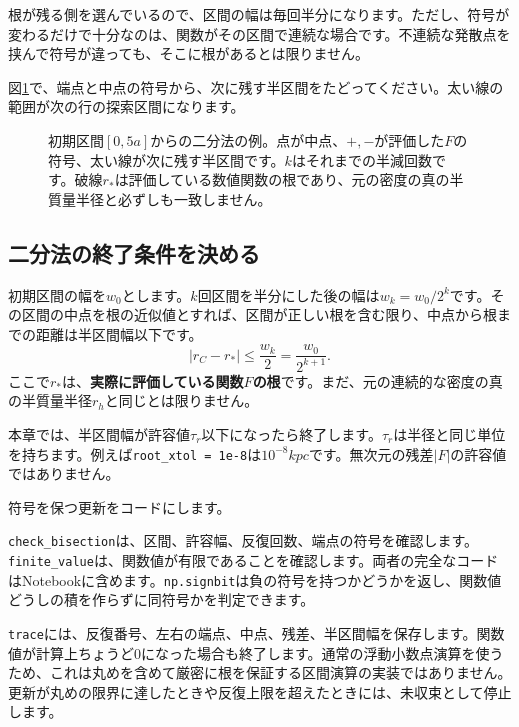 根が残る側を選んでいるので、区間の幅は毎回半分になります。ただし、符号が変わるだけで十分なのは、関数がその区間で連続な場合です。不連続な発散点を挟んで符号が違っても、そこに根があるとは限りません。


図\ref{fig:concept-ch3-bisection}で、端点と中点の符号から、次に残す半区間をたどってください。太い線の範囲が次の行の探索区間になります。
\begin{figure}[!htbp]
\centering

\caption{初期区間$[0,5a]$からの二分法の例。点が中点、$+,-$が評価した$F$の符号、太い線が次に残す半区間です。$k$はそれまでの半減回数です。破線$r_*$は評価している数値関数の根であり、元の密度の真の半質量半径と必ずしも一致しません。}
\label{fig:concept-ch3-bisection}
\end{figure}
\FloatBarrier

\subsection{二分法の終了条件を決める}
初期区間の幅を$w_0$とします。$k$回区間を半分にした後の幅は$w_k=w_0/2^k$です。その区間の中点を根の近似値とすれば、区間が正しい根を含む限り、中点から根までの距離は半区間幅以下です。
\begin{equation}
 |r_C-r_\ast|\leq\frac{w_k}{2}=\frac{w_0}{2^{k+1}}.
 \label{eq:ch3-root-bound}
\end{equation}
ここで$r_\ast$は、\textbf{実際に評価している関数$F$の根}です。まだ、元の連続的な密度の真の半質量半径$r_h$と同じとは限りません。

本章では、半区間幅が許容値$\tau_r$以下になったら終了します。$\tau_r$は半径と同じ単位を持ちます。例えば\texttt{root\_xtol = 1e-8}は$10^{-8}\unit{kpc}$です。無次元の残差$|F|$の許容値ではありません。

符号を保つ更新をコードにします。

\texttt{check\_bisection}は、区間、許容幅、反復回数、端点の符号を確認します。\texttt{finite\_value}は、関数値が有限であることを確認します。両者の完全なコードはNotebookに含めます。\texttt{np.signbit}は負の符号を持つかどうかを返し、関数値どうしの積を作らずに同符号かを判定できます。

\texttt{trace}には、反復番号、左右の端点、中点、残差、半区間幅を保存します。関数値が計算上ちょうど0になった場合も終了します。通常の浮動小数点演算を使うため、これは丸めを含めて厳密に根を保証する区間演算の実装ではありません。更新が丸めの限界に達したときや反復上限を超えたときには、未収束として停止します。

